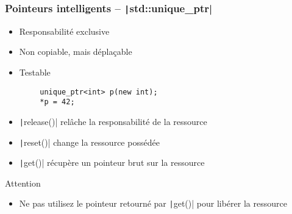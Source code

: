 \documentclass[C++.tex]{subfiles}
\begin{document}
\begin{frame}[fragile]
	\frametitle{Pointeurs intelligents -- \texttt|std::unique_ptr|}
	\begin{itemize}
		\item Responsabilité exclusive
		\item Non copiable, mais déplaçable
		\item Testable
	\end{itemize}

	\begin{verbatim}
		unique_ptr<int> p(new int);
		*p = 42;
	\end{verbatim}

	\begin{itemize}
		\item \texttt|release()| relâche la responsabilité de la ressource


		\item \texttt|reset()| change la ressource possédée


		\item \texttt|get()| récupère un pointeur brut sur la ressource

	\end{itemize}

	\begin{alertblock}{Attention}
		\begin{itemize}
			\item Ne pas utilisez le pointeur retourné par \texttt|get()| pour libérer la ressource
		\end{itemize}
	\end{alertblock}
\end{frame}
\end{document}
